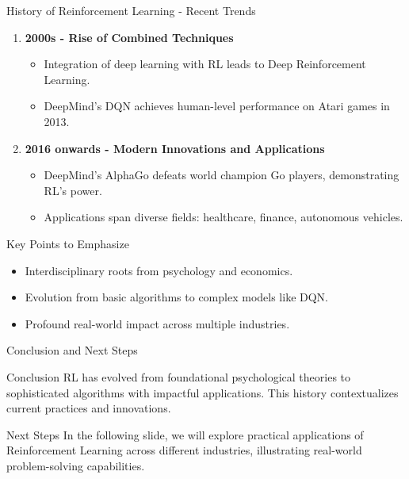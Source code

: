 \documentclass[aspectratio=169]{beamer}
\begin{document}
\begin{frame}[fragile]{History of Reinforcement Learning - Recent Trends}
  \begin{enumerate}[start=5]
    \item \textbf{2000s - Rise of Combined Techniques}
      \begin{itemize}
        \item Integration of deep learning with RL leads to Deep Reinforcement Learning.
        \item DeepMind's DQN achieves human-level performance on Atari games in 2013.
      \end{itemize}

    \item \textbf{2016 onwards - Modern Innovations and Applications}
      \begin{itemize}
        \item DeepMind's AlphaGo defeats world champion Go players, demonstrating RL's power.
        \item Applications span diverse fields: healthcare, finance, autonomous vehicles.
      \end{itemize}
  \end{enumerate}

  \begin{block}{Key Points to Emphasize}
    \begin{itemize}
      \item Interdisciplinary roots from psychology and economics.
      \item Evolution from basic algorithms to complex models like DQN.
      \item Profound real-world impact across multiple industries.
    \end{itemize}
  \end{block}
\end{frame}

\begin{frame}[fragile]{Conclusion and Next Steps}
  \begin{block}{Conclusion}
    RL has evolved from foundational psychological theories to sophisticated algorithms with impactful applications. This history contextualizes current practices and innovations.
  \end{block}
  
  \begin{block}{Next Steps}
    In the following slide, we will explore practical applications of Reinforcement Learning across different industries, illustrating real-world problem-solving capabilities.
  \end{block}
\end{frame}
\end{document}
